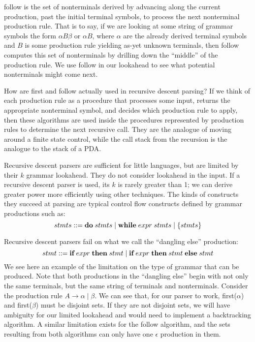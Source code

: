 \documentclass[a4paper, 10pt]{article}
\begin{document}
{\sc follow} is the set of nonterminals derived by advancing along the current production, past the initial terminal symbols, to process the next nonterminal production rule. That is to say, if we are looking at some string of grammar symbols the form $\alpha B \beta$ or $\alpha B$, where $\alpha$ are the already derived terminal symbols and $B$ is some production rule yielding as-yet unknown terminals, then {\sc follow} computes this set of nonterminals by drilling down the ``middle'' of the production rule. We use {\sc follow} in our lookahead to see what potential nonterminals might come next. 

How are {\sc first} and {\sc follow} actually used in recursive descent parsing? If we think of each production rule as a procedure that processes some input, returns the appropriate nonterminal symbol, and decides which production rule to apply, then these algorithms are used inside the procedures represented by production rules to determine the next recursive call. They are the analogue of moving around a finite state control, while the call stack from the recursion is the analogue to the stack of a PDA. 

Recursive descent parsers are sufficient for little languages, but are limited by their $k$ grammar lookahead. They do not consider lookahead in the input. If a recursive descent parser is used, its $k$ is rarely greater than 1; we can derive greater power more efficiently using other techniques. The kinds of constructs they succeed at parsing are typical control flow constructs defined by grammar productions such as:
\begin{equation}
  stmts ::= \text{{\bf do}} \; stmts \; | \; \text{{\bf while}} \; expr \; stmts \; | \; \lbrace stmts \rbrace
\end{equation}

Recursive descent parsers fail on what we call the ``dangling else'' production:
\begin{equation}
  stmt ::= \text{{\bf if}} \; expr \; \text{{\bf then}} \; stmt \; | \; \text{{\bf if}} \; expr \; \text{{\bf then}} \; stmt \; \text{{\bf else}} \; stmt
\end{equation}
We see here an example of the limitation on the type of grammar that can be produced. Note that both productions in the ``dangling else'' begin with not only the same terminals, but the same string of terminals and nonterminals. Consider the production rule \(A \rightarrow \alpha \; | \; \beta\). We can see that, for our parser to work, {\sc first}($\alpha$) and {\sc first}($\beta$) must be disjoint sets. If they are not disjoint sets, we will have ambiguity for our limited lookahead and would need to implement a backtracking algorithm. A similar limitation exists for the {\sc follow} algorithm, and the sets resulting from both algorithms can only have one $\epsilon$ production in them. 
\end{document}
